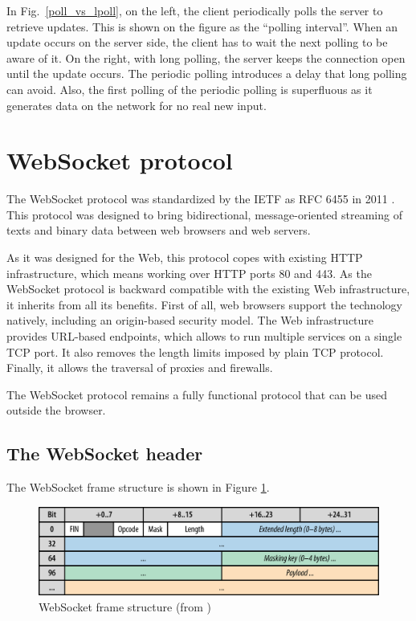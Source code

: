 \documentclass[journal,compsoc]{IEEEtran}
\newcommand{\ws}{WebSocket}
\begin{document}
In Fig.~\ref{poll_vs_lpoll}, on the left, the client periodically polls the server to retrieve updates. This is shown on the figure as the ``polling interval''. When an update occurs on the server side, the client has to wait the next polling to be aware of it. On the right, with long polling, the server keeps the connection open until the update occurs. The periodic polling introduces a delay that long polling can avoid. Also, the first polling of the periodic polling is superfluous as it generates data on the network for no real new input.

\section{\ws{} protocol}
\label{sec:ws}
The \ws{} protocol was standardized by the IETF as RFC 6455 in 2011 \cite{rfc6455}.
This protocol was designed to bring bidirectional, message-oriented streaming of texts and binary data between web browsers and web servers.

As it was designed for the Web, this protocol copes with existing HTTP infrastructure, which means working over HTTP ports 80 and 443.
As the \ws{} protocol is backward compatible with the existing Web infrastructure, it inherits from all its benefits.
First of all, web browsers support the technology natively, including an origin-based security model. %
The Web infrastructure provides URL-based endpoints, which allows to run multiple services on a single TCP port.
It also removes the length limits imposed by plain TCP protocol.
Finally, it allows the traversal of proxies and firewalls.

The \ws{} protocol remains a fully functional protocol that can be used outside the browser.

\subsection{The \ws{} header}
\label{sec:ws-header}
The \ws{} frame structure is shown in Figure \ref{fig:websocket_frame}.

\begin{figure}
    \centering
    \includegraphics[width=\linewidth]{websocket_frame.png}
    \caption{\ws{} frame structure (from \cite{HighPerfBrowserNetworking:websocket})}
    \label{fig:websocket_frame}
\end{figure}
\end{document}
